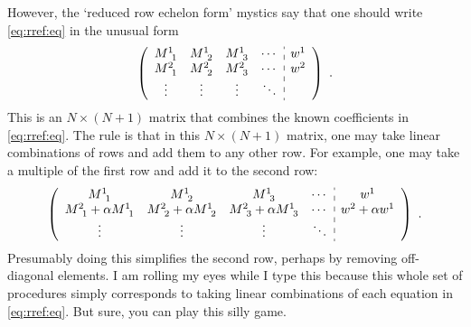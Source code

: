 \documentclass[12pt, oneside]{report}    %
\begin{document}
However, the `reduced row echelon form' mystics say that one should write \eqref{eq:rref:eq} in the unusual form
\begin{align}
    \left(
    \begin{array}{cccc:c}
    M\aij{1}{1} & 
        M\aij{1}{2} & 
        M\aij{1}{3} & 
        \cdots &
        w^1
        \\
        M\aij{2}{1} & 
        M\aij{2}{2} & 
        M\aij{2}{3} & 
        \cdots &
        w^2
        \\
        \vdots &
        \vdots &
        \vdots &
        \ddots 
    \end{array}
    \right)
    \ .
\end{align}
This is an $N\times (N+1)$ matrix that combines the known coefficients in \eqref{eq:rref:eq}. The rule is that in this $N\times (N+1)$ matrix, one may take linear combinations of rows and add them to any other row. For example, one may take a multiple of the first row and add it to the second row:
\begin{align}
    \left(\begin{array}{cccc:c}
        M\aij{1}{1} & 
        M\aij{1}{2} & 
        M\aij{1}{3} & 
        \cdots &
        w^1
        \\
        M\aij{2}{1} + \alpha M\aij{1}{1}  & 
        M\aij{2}{2} + \alpha M\aij{1}{2}  & 
        M\aij{2}{3} + \alpha M\aij{1}{3}  & 
        \cdots &
        w^2 + \alpha w^1
        \\
        \vdots &
        \vdots &
        \vdots &
        \ddots 
    \end{array}\right)
    \ .
\end{align}
Presumably doing this simplifies the second row, perhaps by removing off-diagonal elements. I am rolling my eyes while I type this because this whole set of procedures simply corresponds to taking linear combinations of each equation in \eqref{eq:rref:eq}. But sure, you can play this silly game.
\end{document}
